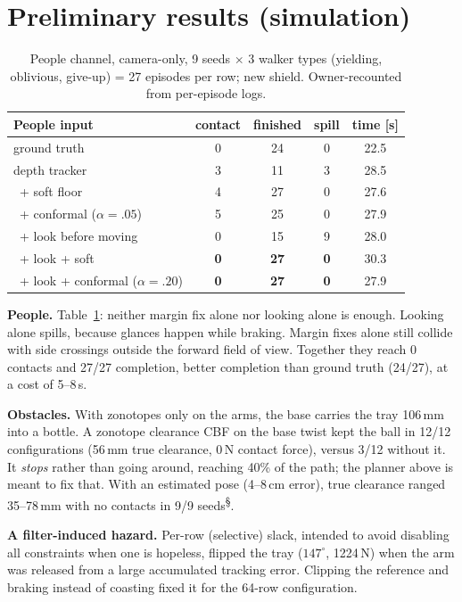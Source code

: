 \documentclass[10pt,twocolumn,letterpaper]{article}
\newcommand{\pre}{\textsuperscript{\S}}   %
\begin{document}
\section{Preliminary results (simulation)}\label{sec:results}
\begin{table}[t]
\centering\small
\caption{People channel, camera-only, 9 seeds $\times$ 3 walker types (yielding, oblivious, give-up) = 27 episodes per row; new shield.
Owner-recounted from per-episode logs.}
\label{tab:people}
\begin{tabular}{@{}lcccc@{}}
\toprule
People input & contact & finished & spill & time [s]\\
\midrule
ground truth & 0 & 24 & 0 & 22.5\\
depth tracker & 3 & 11 & 3 & 28.5\\
\ + soft floor & 4 & 27 & 0 & 27.6\\
\ + conformal ($\alpha{=}.05$) & 5 & 25 & 0 & 27.9\\
\ + look before moving & 0 & 15 & 9 & 28.0\\
\ + look + soft & \textbf{0} & \textbf{27} & \textbf{0} & 30.3\\
\ + look + conformal ($\alpha{=}.20$) & \textbf{0} & \textbf{27} & \textbf{0} & 27.9\\
\bottomrule
\end{tabular}
\vspace{-1mm}
\end{table}

\textbf{People.} Table~\ref{tab:people}: neither margin fix alone nor looking alone is enough. Looking alone spills, because glances
happen while braking. Margin fixes alone still collide with side crossings outside the forward field of view. Together they reach
0 contacts and 27/27 completion, better completion than ground truth (24/27), at a cost of 5--8\,s.

\textbf{Obstacles.} With zonotopes only on the arms, the base carries the tray 106\,mm into a bottle. A zonotope clearance CBF on the base
twist kept the ball in 12/12 configurations (56\,mm true clearance, 0\,N contact force), versus 3/12 without it. It \emph{stops} rather than
going around, reaching 40\% of the path; the planner above is meant to fix that. With an estimated pose (4--8\,cm error), true clearance
ranged 35--78\,mm with no contacts in 9/9 seeds\pre.

\textbf{A filter-induced hazard.} Per-row (selective) slack, intended to avoid disabling all constraints when one is hopeless, flipped the
tray ($147^\circ$, 1224\,N) when the arm was released from a large accumulated tracking error. Clipping the reference and braking instead of
coasting fixed it for the 64-row configuration.
\end{document}
